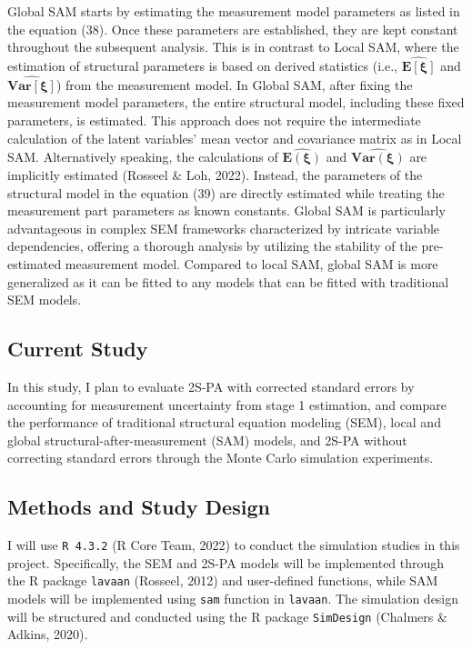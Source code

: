 \documentclass[
  11pt,
  man]{apa6}
\begin{document}
Global SAM starts by estimating the measurement model parameters as listed in the equation (38). Once these parameters are established, they are kept constant throughout the subsequent analysis. This is in contrast to Local SAM, where the estimation of structural parameters is based on derived statistics (i.e., \(\boldsymbol{\widehat{E[\boldsymbol{\xi}]}}\) and \(\boldsymbol{\widehat{Var[\boldsymbol{\xi}]}}\)) from the measurement model. In Global SAM, after fixing the measurement model parameters, the entire structural model, including these fixed parameters, is estimated. This approach does not require the intermediate calculation of the latent variables' mean vector and covariance matrix as in Local SAM. Alternatively speaking, the calculations of \(\boldsymbol{\widehat{E(\boldsymbol{\xi})}}\) and \(\boldsymbol{\widehat{Var(\boldsymbol{\xi})}}\) are implicitly estimated (Rosseel \& Loh, 2022). Instead, the parameters of the structural model in the equation (39) are directly estimated while treating the measurement part parameters as known constants. Global SAM is particularly advantageous in complex SEM frameworks characterized by intricate variable dependencies, offering a thorough analysis by utilizing the stability of the pre-estimated measurement model. Compared to local SAM, global SAM is more generalized as it can be fitted to any models that can be fitted with traditional SEM models.

\hypertarget{current-study}{%
\subsection{Current Study}\label{current-study}}

In this study, I plan to evaluate 2S-PA with corrected standard errors by accounting for measurement uncertainty from stage 1 estimation, and compare the performance of traditional structural equation modeling (SEM), local and global structural-after-measurement (SAM) models, and 2S-PA without correcting standard errors through the Monte Carlo simulation experiments.

\hypertarget{methods-and-study-design}{%
\subsection{Methods and Study Design}\label{methods-and-study-design}}

I will use \texttt{R\ 4.3.2} (R Core Team, 2022) to conduct the simulation studies in this project. Specifically, the SEM and 2S-PA models will be implemented through the R package \texttt{lavaan} (Rosseel, 2012) and user-defined functions, while SAM models will be implemented using \texttt{sam} function in \texttt{lavaan}. The simulation design will be structured and conducted using the R package \texttt{SimDesign} (Chalmers \& Adkins, 2020).
\end{document}
